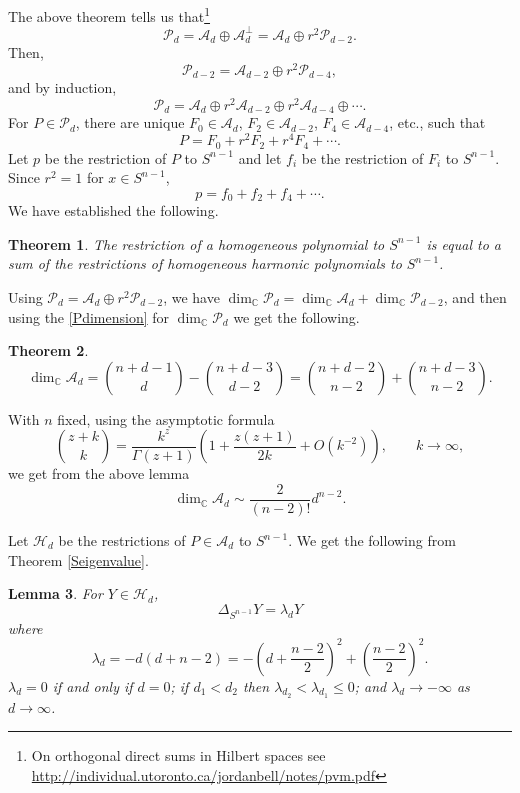 \documentclass{article}
\newtheorem{theorem}{Theorem}
\newtheorem{lemma}[theorem]{Lemma}
\theoremstyle{definition}
\begin{document}
The above theorem tells us that\footnote{On orthogonal direct sums in Hilbert spaces see \url{http://individual.utoronto.ca/jordanbell/notes/pvm.pdf}}
\[
\mathscr{P}_d = \mathscr{A}_d \oplus \mathscr{A}_d^\perp 
= \mathscr{A}_d \oplus r^2 \mathscr{P}_{d-2}.
\]
Then,
\[
\mathscr{P}_{d-2} = \mathscr{A}_{d-2} \oplus r^2 \mathscr{P}_{d-4},
\]
and by induction,
\[
\mathscr{P}_d = \mathscr{A}_d \oplus r^2 \mathscr{A}_{d-2}
\oplus r^2 \mathscr{A}_{d-4} \oplus \cdots.
\]
For $P \in \mathscr{P}_d$, there are unique $F_0 \in \mathscr{A}_d$, $F_2 \in
\mathscr{A}_{d-2}$, $F_4 \in \mathscr{A}_{d-4}$, etc., such that
\[
P=F_0+r^2F_2+r^4F_4+\cdots. 
\]
Let $p$ be the restriction of $P$ to $S^{n-1}$ and let $f_i$ be the restriction of $F_i$ to $S^{n-1}$.
Since $r^2=1$ for $x \in S^{n-1}$,
\[
p = f_0 + f_2 + f_4 + \cdots.
\]
We have established the following.

\begin{theorem}
The restriction of a homogeneous polynomial to $S^{n-1}$ is equal to a sum of the restrictions of homogeneous 
harmonic polynomials to $S^{n-1}$. 
\label{homogeneoussum}
\end{theorem}

Using $\mathscr{P}_d = \mathscr{A}_d \oplus r^2 \mathscr{P}_{d-2}$, we
have $\dim_\mathbb{C} \mathscr{P}_d = \dim_{\mathbb{C}} \mathscr{A}_d + \dim_{\mathbb{C}} \mathscr{P}_{d-2}$, and then using
the  \eqref{Pdimension} for $\dim_\mathbb{C} \mathscr{P}_d$ we get the following.

\begin{theorem}
\[
\dim_\mathbb{C} \mathscr{A}_d = \binom{n+d-1}{d}-\binom{n+d-3}{d-2}
=\binom{n+d-2}{n-2}+\binom{n+d-3}{n-2}.
\]
\label{dimension}
\end{theorem}

With $n$ fixed, using the asymptotic formula
\[
\binom{z+k}{k} = \frac{k^z}{\Gamma(z+1)} \left(1+\frac{z(z+1)}{2k}+O(k^{-2})\right),\qquad k \to \infty,
\]
we get from the above lemma 
\[
\dim_\mathbb{C} \mathscr{A}_d  \sim \frac{2}{(n-2)!} d^{n-2}.
\]

Let $\mathscr{H}_d$ be the restrictions of $P \in \mathscr{A}_d$ to $S^{n-1}$. 
We get the following from  Theorem \ref{Seigenvalue}.

\begin{lemma}
For $Y \in \mathscr{H}_d$,
\[
\Delta_{S^{n-1}} Y =\lambda_d Y
\]
where
\[
\lambda_d = 
 -d(d+n-2)
 =
-\left(d+\frac{n-2}{2}\right)^2+\left(\frac{n-2}{2}\right)^2.
\]
$\lambda_d=0$ if and only if $d=0$; if $d_1<d_2$ then $\lambda_{d_2}<\lambda_{d_1} \leq 0$; and $\lambda_d \to -\infty$ as $d \to \infty$. 
\label{lambdad}
\end{lemma}
\end{document}
